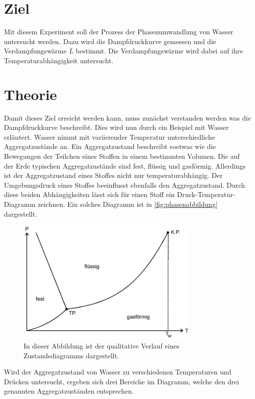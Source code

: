 \section{Ziel}
\label{sec:Ziel}
Mit diesem Experiment soll der Prozess der Phasenumwandlung von Wasser untersucht werden. Dazu wird die Dampfdruckkurve gemessen und die Verdampfungswärme $L$ bestimmt. Die Verdampfungswärme wird
dabei auf ihre Temperaturabhängigkeit untersucht.
\section{Theorie}
\label{sec:Theorie}
Damit dieses Ziel erreicht werden kann, muss zunächst verstanden werden was die Dampfdruckkurve beschreibt. Dies wird nun durch ein Beispiel mit Wasser erläutert.
Wasser nimmt mit variierender Temperatur unterschiedliche Aggregatzustände an. Ein Aggregatzustand beschreibt soetwas wie die Bewegungen der Teilchen eines Stoffen in einem bestimmten Volumen.
Die auf der Erde typischen Aggregatzustände sind fest, flüssig und gasförmig. Allerdings ist der Aggregatzustand eines Stoffes nicht nur temperaturabhängig. Der Umgebungsdruck eines Stoffes 
beeinflusst ebenfalls den Aggregatzustand. Durch diese beiden Abhängigkeiten lässt sich für einen Stoff ein Druck-Temperatur-Diagramm zeichnen. Ein solches Diagramm ist in \autoref{fig:phasenabbildung}
dargestellt.
\begin{figure}
    \centering
    \includegraphics[width=0.8\textwidth]{content/Phasenabbildung.PNG}
	\caption{In dieser Abbildung ist der qualitative Verlauf eines Zustandsdiagramms dargestellt. \cite{v203}}
	\label{fig:phasenabbildung}
\end{figure}
Wird der Aggregatzustand von Wasser zu verschiedenen Temperaturen und Drücken untersucht, ergeben sich drei Bereiche im Diagramm, welche den drei genannten Aggregatzuständen entsprechen.  
